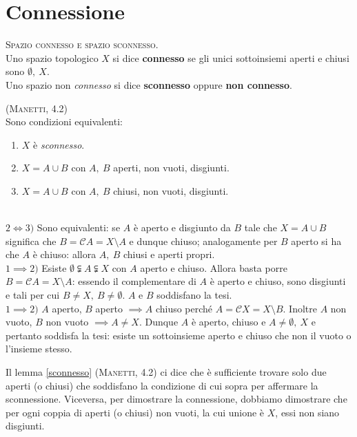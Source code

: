 \section{Connessione}
\begin{define}\textsc{Spazio connesso e spazio sconnesso.}\\
Uno spazio topologico $X$ si dice \textbf{connesso} se gli unici sottoinsiemi aperti e chiusi sono $\emptyset,\ X$.\\
Uno spazio non \textit{connesso} si dice \textbf{sconnesso} oppure \textbf{non connesso}.
\end{define}
\begin{lemming}\label{sconnesso}\textsc{(Manetti, 4.2)}\\
	Sono condizioni equivalenti:
	\begin{enumerate}
		\item $X$ è \textit{sconnesso}.
		\item $X=A\cup B$ con $A,\ B$ aperti, non vuoti, disgiunti.
		\item $X=A\cup B$ con $A,\ B$ chiusi, non vuoti, disgiunti.
	\end{enumerate}
\vspace{-3mm}
\end{lemming}
\begin{demonstration}~{}\\
$2\iff3)$ Sono equivalenti: se $A$ è aperto e disgiunto da $B$ tale che $X=A\cup B$ significa che $B=\mathcal{C}A=X\setminus A$ e dunque chiuso; analogamente per $B$ aperto si ha che $A$ è chiuso: allora $A,\ B$ chiusi e aperti propri.\\
$1\implies2)$ Esiste $\emptyset\subsetneqq A \subsetneqq X$ con $A$ aperto e chiuso. Allora basta porre $B=\mathcal{C}A=X\setminus A$: essendo il complementare di $A$ è aperto e chiuso, sono disgiunti e tali per cui $B\neq X,\ B\neq \emptyset$. $A$ e $B$ soddisfano la tesi.\\
$1\implies2)$ $A$ aperto, $B$ aperto $\implies A$ chiuso perché $A=\mathcal{C}X=X\setminus B$. Inoltre $A$ non vuoto, $B$ non vuoto $\implies A\neq X$. Dunque $A$ è aperto, chiuso e $A\neq \emptyset,\ X$ e pertanto soddisfa la tesi: esiste un sottoinsieme aperto e chiuso che non il vuoto o l'insieme stesso.
\end{demonstration}
\begin{observe}
	Il lemma \ref{sconnesso} \textsc{(Manetti, 4.2)} ci dice che è sufficiente trovare solo due aperti (o chiusi) che soddisfano la condizione di cui sopra per affermare la sconnessione. Viceversa, per dimostrare la connessione, dobbiamo dimostrare che per ogni coppia di aperti (o chiusi) non vuoti, la cui unione è $X$, essi non siano disgiunti.
\end{observe}
